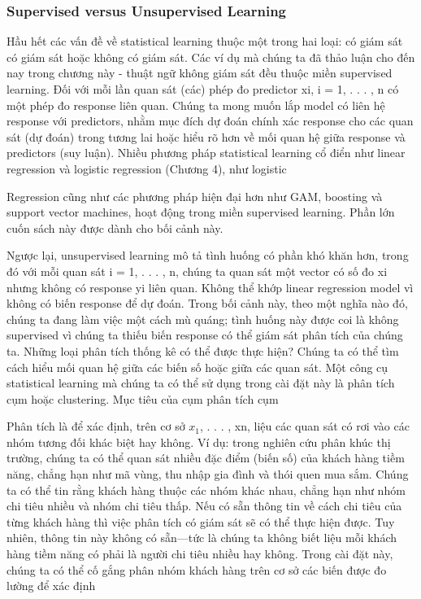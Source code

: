 \subsubsection{Supervised versus Unsupervised Learning}

Hầu hết các vấn đề về statistical learning thuộc một trong hai loại: có giám sát có giám sát hoặc không có giám sát. Các ví dụ mà chúng ta đã thảo luận cho đến nay trong chương này - thuật ngữ không giám sát đều thuộc miền supervised learning. Đối với mỗi lần quan sát (các) phép đo predictor xi, i = 1, . . . , n có một phép đo response liên quan. Chúng ta mong muốn lắp model có liên hệ response với predictors, nhằm mục đích dự đoán chính xác response cho các quan sát (dự đoán) trong tương lai hoặc hiểu rõ hơn về mối quan hệ giữa response và predictors (suy luận). Nhiều phương pháp statistical learning cổ điển như linear regression và logistic regression (Chương 4), như logistic

Regression cũng như các phương pháp hiện đại hơn như GAM, boosting và support vector machines, hoạt động trong miền supervised learning. Phần lớn cuốn sách này được dành cho bối cảnh này.

Ngược lại, unsupervised learning mô tả tình huống có phần khó khăn hơn, trong đó với mỗi quan sát i = 1, . . . , n, chúng ta quan sát một vector có số đo xi nhưng không có response yi liên quan. Không thể khớp linear regression model vì không có biến response để dự đoán. Trong bối cảnh này, theo một nghĩa nào đó, chúng ta đang làm việc một cách mù quáng; tình huống này được coi là không supervised vì chúng ta thiếu biến response có thể giám sát phân tích của chúng ta. Những loại phân tích thống kê có thể được thực hiện? Chúng ta có thể tìm cách hiểu mối quan hệ giữa các biến số hoặc giữa các quan sát. Một công cụ statistical learning mà chúng ta có thể sử dụng trong cài đặt này là phân tích cụm hoặc clustering. Mục tiêu của cụm phân tích cụm

Phân tích là để xác định, trên cơ sở $x_{1}$, . . . , xn, liệu các quan sát có rơi vào các nhóm tương đối khác biệt hay không. Ví dụ: trong nghiên cứu phân khúc thị trường, chúng ta có thể quan sát nhiều đặc điểm (biến số) của khách hàng tiềm năng, chẳng hạn như mã vùng, thu nhập gia đình và thói quen mua sắm. Chúng ta có thể tin rằng khách hàng thuộc các nhóm khác nhau, chẳng hạn như nhóm chi tiêu nhiều và nhóm chi tiêu thấp. Nếu có sẵn thông tin về cách chi tiêu của từng khách hàng thì việc phân tích có giám sát sẽ có thể thực hiện được. Tuy nhiên, thông tin này không có sẵn—tức là chúng ta không biết liệu mỗi khách hàng tiềm năng có phải là người chi tiêu nhiều hay không. Trong cài đặt này, chúng ta có thể cố gắng phân nhóm khách hàng trên cơ sở các biến được đo lường để xác định

